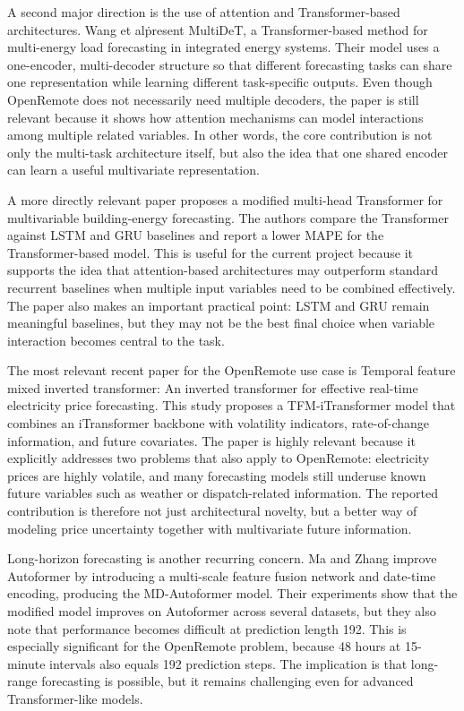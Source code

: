 A second major direction is the use of attention and Transformer-based architectures. Wang et al\. present MultiDeT, a Transformer-based method for multi-energy load forecasting in integrated energy systems\cite{Wang2026}. Their model uses a one-encoder, multi-decoder structure so that different forecasting tasks can share one representation while learning different task-specific outputs. Even though OpenRemote does not necessarily need multiple decoders, the paper is still relevant because it shows how attention mechanisms can model interactions among multiple related variables. In other words, the core contribution is not only the multi-task architecture itself, but also the idea that one shared encoder can learn a useful multivariate representation.

A more directly relevant paper proposes a modified multi-head Transformer for multivariable building-energy forecasting\cite{Oliveira2023}. The authors compare the Transformer against LSTM and GRU baselines and report a lower MAPE for the Transformer-based model. This is useful for the current project because it supports the idea that attention-based architectures may outperform standard recurrent baselines when multiple input variables need to be combined effectively. The paper also makes an important practical point: LSTM and GRU remain meaningful baselines, but they may not be the best final choice when variable interaction becomes central to the task.

The most relevant recent paper for the OpenRemote use case is Temporal feature mixed inverted transformer: An inverted transformer for effective real-time electricity price forecasting\cite{Wang2026}. This study proposes a TFM-iTransformer model that combines an iTransformer backbone with volatility indicators, rate-of-change information, and future covariates. The paper is highly relevant because it explicitly addresses two problems that also apply to OpenRemote: electricity prices are highly volatile, and many forecasting models still underuse known future variables such as weather or dispatch-related information. The reported contribution is therefore not just architectural novelty, but a better way of modeling price uncertainty together with multivariate future information.

Long-horizon forecasting is another recurring concern. Ma and Zhang improve Autoformer by introducing a multi-scale feature fusion network and date-time encoding, producing the MD-Autoformer model\cite{Ma2025}. Their experiments show that the modified model improves on Autoformer across several datasets, but they also note that performance becomes difficult at prediction length 192. This is especially significant for the OpenRemote problem, because 48 hours at 15-minute intervals also equals 192 prediction steps. The implication is that long-range forecasting is possible, but it remains challenging even for advanced Transformer-like models.

